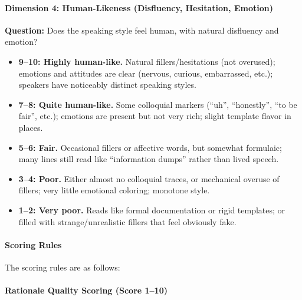 \paragraph{Dimension 4: Human-Likeness (Disfluency, Hesitation, Emotion)}
\textbf{Question:} Does the speaking style feel human, with natural disfluency and emotion?
\begin{itemize}
  \item \textbf{9--10: Highly human-like.}
  Natural fillers/hesitations (not overused);
  emotions and attitudes are clear (nervous, curious, embarrassed, etc.);
  speakers have noticeably distinct speaking styles.

  \item \textbf{7--8: Quite human-like.}
  Some colloquial markers (``uh'', ``honestly'', ``to be fair'', etc.);
  emotions are present but not very rich;
  slight template flavor in places.

  \item \textbf{5--6: Fair.}
  Occasional fillers or affective words, but somewhat formulaic;
  many lines still read like ``information dumps'' rather than lived speech.

  \item \textbf{3--4: Poor.}
  Either almost no colloquial traces, or mechanical overuse of fillers;
  very little emotional coloring; monotone style.

  \item \textbf{1--2: Very poor.}
  Reads like formal documentation or rigid templates;
  or filled with strange/unrealistic fillers that feel obviously fake.
\end{itemize}

\paragraph{Scoring Rules}
The scoring rules are as follows:
\paragraph{Rationale Quality Scoring (Score 1--10)}

